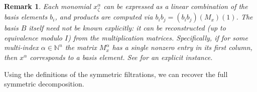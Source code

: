 \documentclass[a4paper,11p]{amsart}
\newcommand{\m}{\mathfrak m}
\newtheorem{remark0}[defn0]{Remark}
\newenvironment{remark}{ \begin{remark0}\rm}{\end{remark0}}
\newcommand{\K}{\mathbb K}
\begin{document}

\begin{remark}
Each monomial $x_\zeta^{\alpha}$ can be expressed as a linear combination of the basis elements $b_i$, and products are computed via 
$
b_i b_j = (b_i b_j)(M_x)(1)
$.
The basis $B$ itself need not be known explicitly: it can be reconstructed (up to equivalence modulo $I$) from the multiplication matrices.  
Specifically, if for some multi-index $\alpha \in \mathbb{N}^n$ the matrix $M_x^{\alpha}$ has a single nonzero entry in its first column, then $x^{\alpha}$ corresponds to a basis element.  
See  for an explicit instance.
\end{remark}

Using the definitions of the symmetric filtrations, we can recover the full symmetric decomposition. 
\end{document}
